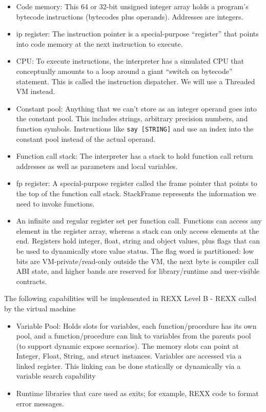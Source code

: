 \begin{itemize}
\item Code memory: This 64 or 32-bit unsigned integer array holds a program's \textquotedbl{}bytecode\textquotedbl{} instructions
(bytecodes plus operands). Addresses are integers.

\item ip register: The instruction pointer is a special-purpose ``register'' that
points into code memory at the next instruction to execute.

\item CPU: To execute instructions, the interpreter has a simulated CPU that
conceptually amounts to a loop around a giant ``switch on bytecode'' statement.
This is called the instruction dispatcher. We will use a Threaded VM instead.

\item Constant pool: Anything that we can't store as an integer operand
goes into the constant pool. This includes strings, arbitrary precision numbers,
and function symbols. Instructions like \texttt{say {[}STRING{]}} and use an index into
the constant pool instead of the actual operand.

\item Function call stack: The interpreter has a stack to hold function call return
addresses as well as parameters and local variables.

\item fp register: A special-purpose register called the frame pointer that points
to the top of the function call stack. StackFrame represents the information
we need to invoke functions.

\item An infinite and regular register set per function call. Functions can access
any element in the register array, whereas a stack can only access elements
at the end. Registers hold integer, float, string and object values, plus flags
that can be used to dynamically store value status. The flag word is
partitioned: low bits are VM-private/read-only outside the VM, the next byte is
compiler call ABI state, and higher bands are reserved for library/runtime and
user-visible contracts.

\end{itemize}

The following capabilities will be implemented in REXX Level B - REXX called by the virtual machine

\begin{itemize}
\item Variable Pool: Holds slots for variables, each function/procedure has its own
pool, and a function/procedure can \textquotedbl{}link\textquotedbl{} to variables from the parents pool (to
support dynamic expose scenarios).
The memory slots can point at Integer, Float, String, and struct instances.
Variables are accessed via a linked register. This linking can be done statically
or dynamically via a variable search capability

\item Runtime libraries that care used as \textquotedbl{}exits\textquotedbl{}; for example, REXX code to format error messages.

\end{itemize}

